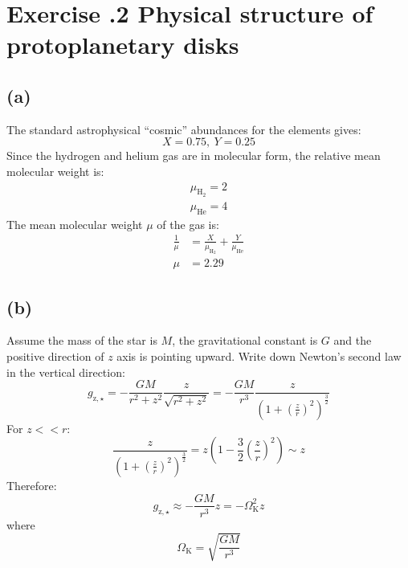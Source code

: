 \documentclass[a4paper,12pt]{article}
\begin{document}
\section*{\textbf{Exercise \uppercase\expandafter{}.2 Physical structure of protoplanetary disks}}
\subsection*{(a)}
The standard astrophysical “cosmic” abundances for the elements gives:
\begin{equation*}
    X=0.75, \ Y= 0.25
\end{equation*}
Since the hydrogen and helium gas are in molecular form, the relative mean molecular weight is:
\begin{align*}
    \mu_{\text{H}_2} = 2 \\
    \mu_{\text{He}} = 4
\end{align*}
The mean molecular weight $\mu$ of the gas is:
\begin{align*}
    \frac{1}{\mu} &= \frac{X}{\mu_{\text{H}_2}} + \frac{Y}{\mu_{\text{He}}} \\
    \mu &= 2.29
\end{align*}

\subsection*{(b)}
Assume the mass of the star is $M$, the gravitational constant is $G$ and the positive direction of $z$ axis is pointing upward.
Write down Newton's second law in the vertical direction:
\begin{equation*}
    g_{\text{z}, \star} = - \frac{GM}{r^2 + z^2} \frac{z}{\sqrt{r^2 + z^2}} = - \frac{GM}{r^3} \frac{z}{(1 + (\frac{z}{r})^2)^{\frac{3}{2}}}
\end{equation*}
For $z << r$:
\begin{equation*}
    \frac{z}{(1 + (\frac{z}{r})^2)^{\frac{3}{2}}} = z(1-\frac{3}{2} (\frac{z}{r})^2) \sim z
\end{equation*}
Therefore:
\begin{equation*}
    g_{\text{z}, \star} \approx - \frac{GM}{r^3} z = - \Omega^2_\text{K} z
\end{equation*}
where
\begin{equation*}
    \Omega_\text{K} = \sqrt{\frac{GM}{r^3}}
\end{equation*}
\end{document}
